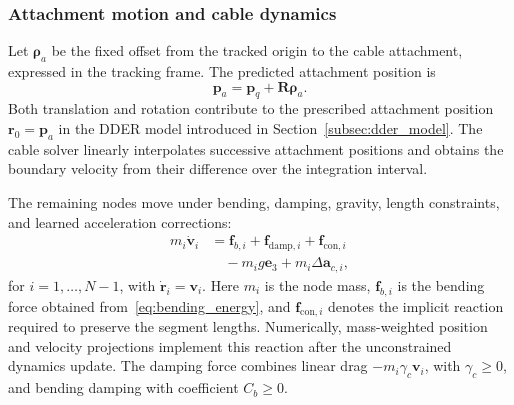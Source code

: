 \documentclass[letterpaper, 10 pt, conference]{ieeeconf}
\begin{document}
\subsubsection{Attachment motion and cable dynamics}
Let $\boldsymbol\rho_a$ be the fixed offset from the tracked
origin to the cable attachment, expressed in the tracking frame.
The predicted attachment position is
\begin{equation}
\mathbf{p}_a=\mathbf{p}_q+\mathbf{R}\boldsymbol\rho_a.
\label{eq:attachment_mapping}
\end{equation}
Both translation and rotation contribute to the prescribed
attachment position $\mathbf r_0=\mathbf p_a$ in the DDER model
introduced in Section~\ref{subsec:dder_model}.
The cable solver linearly interpolates successive attachment
positions and obtains the boundary velocity from their difference
over the integration interval.

The remaining nodes move under bending, damping, gravity,
length constraints, and learned acceleration corrections:
\begin{equation}
\begin{aligned}
m_i\dot{\mathbf{v}}_i
&=\mathbf{f}_{b,i}+\mathbf{f}_{\mathrm{damp},i}
  +\mathbf{f}_{\mathrm{con},i}\\
&\quad-m_i g\mathbf{e}_3+m_i\Delta\mathbf{a}_{c,i},
\end{aligned}
\label{eq:driven_cable_dynamics}
\end{equation}
for $i=1,\ldots,N-1$, with
$\dot{\mathbf{r}}_i=\mathbf{v}_i$.
Here $m_i$ is the node mass, $\mathbf{f}_{b,i}$ is the bending
force obtained from~\eqref{eq:bending_energy}, and
$\mathbf{f}_{\mathrm{con},i}$ denotes the implicit reaction
required to preserve the segment lengths. Numerically, mass-weighted
position and velocity projections implement this reaction after
the unconstrained dynamics update.
The damping force combines linear drag
$-m_i\gamma_c\mathbf v_i$, with $\gamma_c\geq0$, and bending
damping with coefficient $C_b\geq0$.
\end{document}
